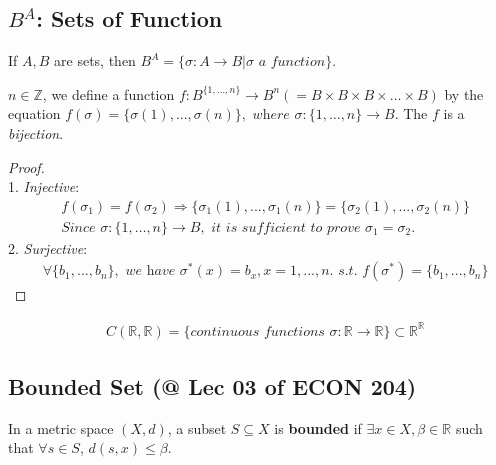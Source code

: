 \documentclass[11pt]{elegantbook}
\begin{document}
\subsection{$B^A$: Sets of Function}
If $A,B$ are sets, then $B^A=\{\sigma:A \rightarrow B| \sigma \textit{ a function}\}$.
\begin{example}
    $n\in \mathbb{Z}$, we define a function $f: B^{\{1,\dots,n\}} \rightarrow B^n(=B\times B\times B\times \dots \times B)$ by the equation
    $f(\sigma)=\{\sigma(1),...,\sigma(n)\}, \textit{ where }\sigma:\{1,\dots,n\} \rightarrow B$. The $f$ is a \textit{bijection}.
\end{example}
\begin{proof}
    \quad\\
    1. \textit{Injective}:
    \begin{equation}
        \begin{aligned}
            &f(\sigma_1)=f(\sigma_2)
            \Rightarrow \{\sigma_1(1),...,\sigma_1(n)\}=\{\sigma_2(1),...,\sigma_2(n)\}\\
            &\textit{Since }\sigma:\{1,\dots,n\} \rightarrow B,\textit{ it is sufficient to prove }\sigma_1=\sigma_2.
        \end{aligned}
        \nonumber
    \end{equation}
    2. \textit{Surjective}:
    \begin{equation}
        \begin{aligned}
            &\forall \{b_1,...,b_n\},\textit{ we have }\sigma^*(x)=b_x,x=1,...,n.\textit{ s.t. }f(\sigma^*)=\{b_1,...,b_n\}
        \end{aligned}
        \nonumber
    \end{equation}

\end{proof}
\begin{example}
    \begin{equation}
        \begin{aligned}
            & C(\mathbb{R},\mathbb{R})=\{\textit{continuous functions }\sigma:\mathbb{R} \rightarrow \mathbb{R} \}\subset \mathbb{R}^\mathbb{R}
        \end{aligned}
        \nonumber
    \end{equation}
\end{example}



\subsection{Bounded Set \small{(@ Lec 03 of ECON 204)}}
\begin{definition}
    \normalfont
    In a metric space $(X, d)$, a subset $S \subseteq X$ is \textbf{bounded} if $\exists x \in X, \beta \in \mathbb{R}$ such that $\forall s \in S$, $d(s, x) \leq \beta$.
\end{definition}
\end{document}
